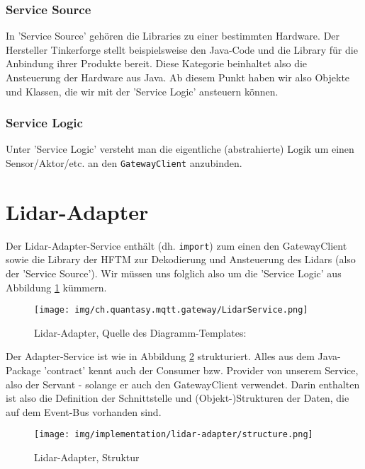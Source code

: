 \subsubsection{Service Source}
In 'Service Source' gehören die Libraries zu einer bestimmten Hardware. Der Hersteller Tinkerforge\cite{tinkerforge-gmbh} stellt beispielsweise den Java-Code und die Library für die Anbindung ihrer Produkte bereit. Diese Kategorie beinhaltet also die Ansteuerung der Hardware aus Java. Ab diesem Punkt haben wir also Objekte und Klassen, die wir mit der 'Service Logic' ansteuern können.
\subsubsection{Service Logic}
Unter 'Service Logic' versteht man die eigentliche (abstrahierte) Logik um einen Sensor/Aktor/etc. an den \verb|GatewayClient| anzubinden.


\section{Lidar-Adapter}
Der Lidar-Adapter-Service enthält (dh. \verb|import|) zum einen den GatewayClient sowie die Library der HFTM zur Dekodierung und Ansteuerung des Lidars (also der 'Service Source'). Wir müssen uns folglich also um die 'Service Logic' aus Abbildung \ref{fig:lidarservice} kümmern.
\begin{figure}[H]
	\centering
	\texttt{[image: img/ch.quantasy.mqtt.gateway/LidarService.png]}
	\caption{Lidar-Adapter, Quelle des Diagramm-Templates: \cite{ch.quantasy.mqtt.gateway}}
	\label{fig:lidarservice}
\end{figure}

Der Adapter-Service ist wie in Abbildung \ref{fig:structure_lidarservice} strukturiert. Alles aus dem Java-Package 'contract' kennt auch der Consumer bzw. Provider von unserem Service, also der Servant - solange er auch den GatewayClient verwendet. Darin enthalten ist also die Definition der Schnittstelle und (Objekt-)Strukturen der Daten, die auf dem Event-Bus vorhanden sind.
\begin{figure}[H]
	\centering
	\texttt{[image: img/implementation/lidar-adapter/structure.png]}
	\caption{Lidar-Adapter, Struktur}
	\label{fig:structure_lidarservice}
\end{figure}

